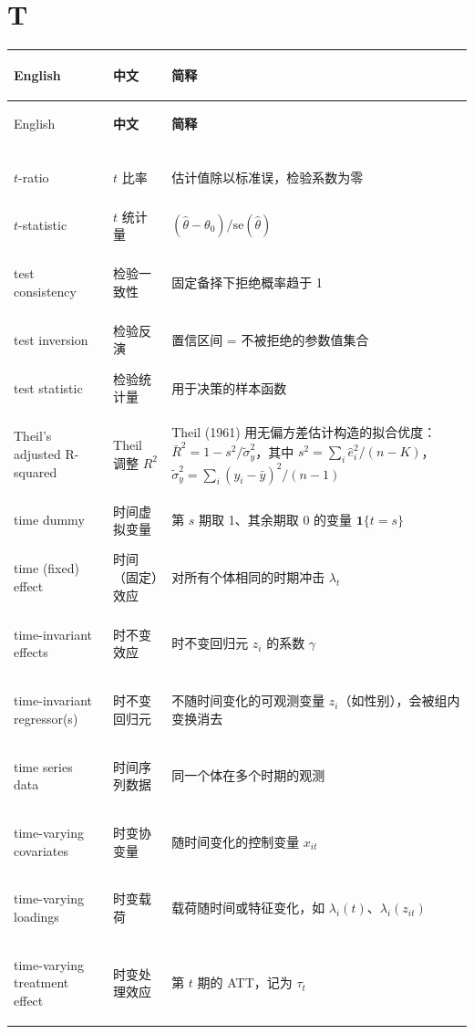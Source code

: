 \par{}\ifdim\dimexpr\pagegoal-\pagetotal\relax<16\baselineskip\newpage\fi
\section*{T}
\begin{longtable}{@{}>{\bfseries\boldmath\raggedright\arraybackslash}p{4.6cm}>{\raggedright\arraybackslash}p{3.2cm}>{\raggedright\arraybackslash}p{\dimexpr\textwidth-7.8cm-4\tabcolsep\relax}@{}}
\toprule
English & \textbf{中文} & \textbf{简释}\\
\midrule
\endfirsthead
\toprule
English & \textbf{中文} & \textbf{简释}\\
\midrule
\endhead
\midrule
\multicolumn{3}{r@{}}{\footnotesize\itshape （续下页）}\\
\endfoot
\bottomrule
\endlastfoot
$t$-ratio & $t$ 比率 & 估计值除以标准误，检验系数为零 \\
$t$-statistic & $t$ 统计量 & $(\hat\theta-\theta_0)/\mathrm{se}(\hat\theta)$ \\
test consistency & 检验一致性 & 固定备择下拒绝概率趋于 1 \\
test inversion & 检验反演 & 置信区间 = 不被拒绝的参数值集合 \\
test statistic & 检验统计量 & 用于决策的样本函数 \\
Theil's adjusted R-squared & Theil 调整 $R^2$ & Theil (1961) 用无偏方差估计构造的拟合优度：$\bar R^2=1-s^2/\tilde\sigma_y^2$，其中 $s^2=\sum_i\hat e_i^2/(n-K)$，$\tilde\sigma_y^2=\sum_i(y_i-\bar y)^2/(n-1)$ \\
time dummy & 时间虚拟变量 & 第 $s$ 期取 1、其余期取 0 的变量 $\mathbf{1}\{t=s\}$ \\
time (fixed) effect & 时间（固定）效应 & 对所有个体相同的时期冲击 $\lambda_t$ \\
time-invariant effects & 时不变效应 & 时不变回归元 $z_i$ 的系数 $\gamma$ \\
time-invariant regressor(s) & 时不变回归元 & 不随时间变化的可观测变量 $z_i$（如性别），会被组内变换消去 \\
time series data & 时间序列数据 & 同一个体在多个时期的观测 \\
time-varying covariates & 时变协变量 & 随时间变化的控制变量 $x_{it}$ \\
time-varying loadings & 时变载荷 & 载荷随时间或特征变化，如 $\lambda_i(t)$、$\lambda_i(z_{it})$ \\
time-varying treatment effect & 时变处理效应 & 第 $t$ 期的 ATT，记为 $\tau_t$ \\

\end{longtable}
